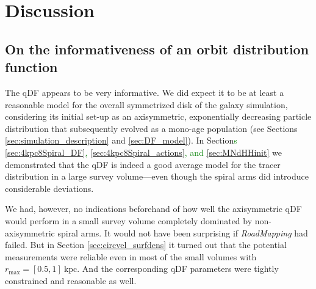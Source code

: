 \documentclass[iop,revtex4,numberedappendix,appendixfloats]{emulateapj}
\newcommand{\RM}{{\sl RoadMapping}}
\newcommand{\NEW}[1]{\textcolor{Green}{#1}}
\newcommand{\hiddenComment}[1]{}
\newcommand{\OLD}[1]{}
\begin{document}
\hiddenComment{[TO DO: HW writes about the above discussion: "We should discuss this. I am still not 100\% sure I get the point. Is the fact that we predic the potential far away from most stars correctly a consequence of having used a clever functional form.." Jo writes: "Probably comes from the fact that the N-body model was setup with a simple model for the Milky Way. But I think we can just not discuss this in the current paper."]}

\section{Discussion} \label{sec:discussion}

\subsection{On the informativeness of an orbit distribution function}

The qDF appears to be very informative. We did expect it to be at least a reasonable model for the overall symmetrized disk of the galaxy simulation, considering its initial set-up as an axisymmetric, exponentially decreasing particle distribution that subsequently evolved as a mono-age population (see Sections \ref{sec:simulation_description} and \ref{sec:DF_model}). In Section\NEW{s} \ref{sec:4kpc8Spiral_DF}\NEW{,}\OLD{ and} \ref{sec:4kpc8Spiral_actions}\NEW{, and \ref{sec:MNdHHinit}} we demonstrated that the qDF is indeed a good average model for the tracer distribution in a large survey volume---even though the spiral arms did introduce considerable deviations.

We had, however, no indications beforehand of how well the axisymmetric qDF would perform in a small survey volume completely dominated by non-axisymmetric spiral arms. It would not have been surprising if \RM{} had failed. But in Section \ref{sec:circvel_surfdens} it turned out that the potential measurements were reliable even in most of the small volumes with $r_\text{max}=[0.5,1]~\text{kpc}$. And the corresponding qDF parameters were tightly constrained and reasonable as well. 
\end{document}

